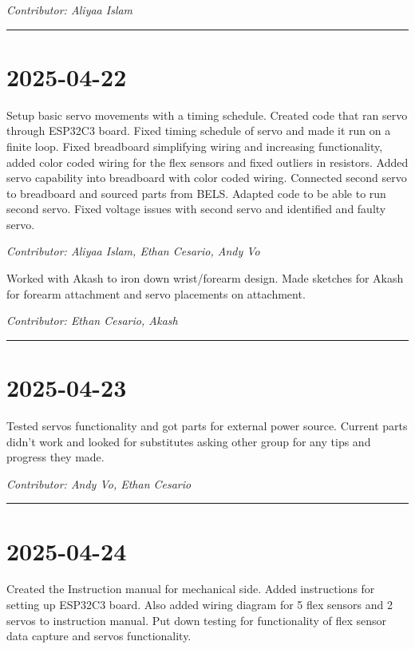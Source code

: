 \documentclass[12pt]{article}
\begin{document}
\vspace{1em}
\noindent\textit{Contributor: Aliyaa Islam}
\vspace{1em}

\hrule






\section*{2025-04-22}




\vspace{1em}
Setup basic servo movements with a timing schedule. Created code that ran servo through ESP32C3 board. Fixed timing schedule of servo and made it run on a finite loop. Fixed breadboard simplifying wiring and increasing functionality, added color coded wiring for the flex sensors and fixed outliers in resistors. Added servo capability into breadboard with color coded wiring. Connected second servo to breadboard and sourced parts from BELS. Adapted code to be able to run second servo. Fixed voltage issues with second servo and identified and faulty servo.

\vspace{1em}

\vspace{1em}
\noindent\textit{Contributor: Aliyaa Islam, Ethan Cesario, Andy Vo}
\vspace{1em}

Worked with Akash to iron down wrist/forearm design. Made sketches for Akash for forearm attachment and servo placements on attachment.

\vspace{1em}
\noindent\textit{Contributor: Ethan Cesario, Akash}
\vspace{1em}
\hrule

\section*{2025-04-23}
Tested servos functionality and got parts for external power source. Current parts didn't work and looked for substitutes asking other group for any tips and progress they made.

\vspace{1em}
\noindent\textit{Contributor: Andy Vo, Ethan Cesario}
\vspace{1em}
\hrule

\section*{2025-04-24}
Created the Instruction manual for mechanical side. Added instructions for setting up ESP32C3 board. Also added wiring diagram for 5 flex sensors and 2 servos to instruction manual.
Put down testing for functionality of flex sensor data capture and servos functionality.
\end{document}
